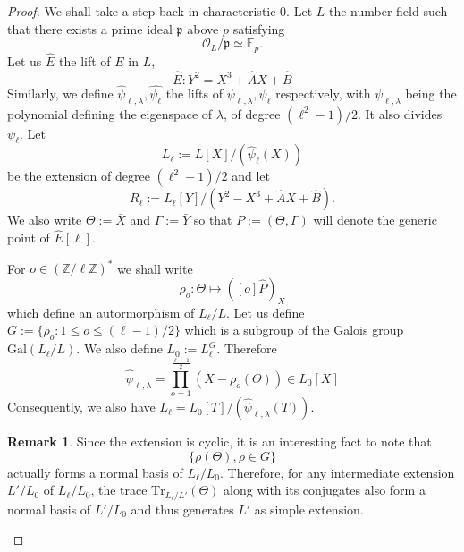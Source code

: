\documentclass[12pt]{article}
\theoremstyle{plain}
\theoremstyle{definition}
\newtheorem*{remark}{Remark}
\def\Z{\ensuremath{\mathbb{Z}}}
\def\F{\ensuremath{\mathbb{F}}}
\begin{document}
\begin{proof}
We shall take a step back in characteristic $0$. Let $L$ the number field 
such that there exists a prime ideal $\mathfrak{p}$ above $p$ satisfying 
\begin{equation}
\mathcal{O}_L/\mathfrak{p} \simeq \F_p.
\end{equation}
Let us $\widehat{E}$ the lift of $E$ in $L$,
\[
\widehat{E} : Y^2 = X^3 + \widehat{A}X + \widehat{B}
\]
Similarly, we define $\widehat{\psi}_{\ell,\lambda}, \widehat{\psi_\ell}$ the 
lifts of $\psi_{\ell,\lambda}, \psi_\ell$ respectively, with 
$\psi_{\ell,\lambda}$ being the polynomial defining the eigenspace of $\lambda$, 
of degree $(\ell^2 - 1)/2$. It also divides $\psi_\ell$. Let 
\[
L_\ell:=L[X]/(\widehat{\psi}_\ell(X))
\]
be the extension of degree $(\ell^2-1)/2$ and let 
\[
R_\ell:=L_\ell[Y]/(Y^2-X^3+\widehat{A}X+\widehat{B}). 
\]
We also write $\Theta:=\bar{X}$ and $\Gamma:=\bar{Y}$ so that 
$P:=(\Theta,\Gamma)$ will denote the generic point of $\widehat{E}[\ell]$.

For $o\in(\Z/\ell\Z)^{\ast}$ we shall write
\begin{equation}
\rho_o : \Theta \mapsto ([o]\widehat{P})_X
\end{equation}
which define an autormorphism of $L_\ell/L$. Let us define 
$G:=\lbrace{\rho_o : 1 \leq o\leq (\ell-1)/2}\rbrace$ which is a subgroup of 
the Galois group $\text{Gal}(L_\ell/L)$. We also define $L_0 := L_\ell^G$. Therefore
\begin{equation}
\widehat{\psi}_{\ell,\lambda}=\prod_{o=1}^{\tfrac{\ell-1}{2}}{(X-\rho_o(\Theta))}\in
L_0[X]
\end{equation}
Consequently, we also have $L_\ell = L_0[T]/(\widehat{\psi}_{\ell,\lambda}(T))$.

\begin{remark}
Since the extension is cyclic, it is an interesting fact to note that
\[
\lbrace{\rho(\Theta), \rho\in G}\rbrace
\]
actually forms a normal basis of $L_\ell/L_0$. Therefore, for any intermediate 
extension $L'/L_0$ of $L_\ell/L_0$, the trace $\text{Tr}_{L_\ell/L'}(\Theta)$ 
along with its conjugates also form a normal basis of $L'/L_0$ and thus 
generates $L'$ as simple extension.
\end{remark}


\end{proof}
\end{document}
